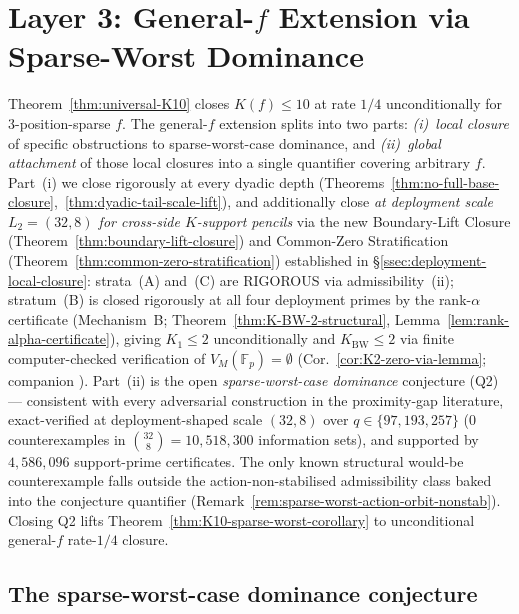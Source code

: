 \documentclass[11pt]{article}
\theoremstyle{definition}
\theoremstyle{remark}
\begin{document}
\section{Layer 3: General-$f$ Extension via Sparse-Worst Dominance}
\label{sec:sparse-worst}

\noindent Theorem~\ref{thm:universal-K10} closes $K(f) \leq 10$ at
rate $1/4$ unconditionally for $3$-position-sparse $f$. The
general-$f$ extension splits into two parts: \emph{(i)~local
closure} of specific obstructions to sparse-worst-case dominance,
and \emph{(ii)~global attachment} of those local closures into a
single quantifier covering arbitrary $f$. Part~(i) we close
rigorously at every dyadic depth
(Theorems~\ref{thm:no-full-base-closure},~\ref{thm:dyadic-tail-scale-lift}),
and additionally close \emph{at deployment scale $L_2 = (32, 8)$ for
cross-side $K$-support pencils} via the new Boundary-Lift Closure
(Theorem~\ref{thm:boundary-lift-closure}) and Common-Zero
Stratification (Theorem~\ref{thm:common-zero-stratification})
established in \S\ref{ssec:deployment-local-closure}: strata~(A) and~(C)
are RIGOROUS via admissibility~(ii); stratum~(B) is closed rigorously
at all four deployment primes by the rank-$\alpha$ certificate
(Mechanism~B; Theorem~\ref{thm:K-BW-2-structural},
Lemma~\ref{lem:rank-alpha-certificate}), giving
$K_1 \leq 2$ unconditionally and $K_{\mathrm{BW}} \leq 2$ via finite
computer-checked verification of $V_M(\mathbb{F}_p) = \emptyset$
(Cor.~\ref{cor:K2-zero-via-lemma}; companion \cite{CompanionRepo}).
Part~(ii) is the open \emph{sparse-worst-case dominance} conjecture
(Q2) --- consistent with every adversarial construction in the
proximity-gap literature, exact-verified at deployment-shaped scale
$(32, 8)$ over $q \in \{97, 193, 257\}$ ($0$ counterexamples in
$\binom{32}{8} = 10{,}518{,}300$ information sets), and supported
by $4{,}586{,}096$ support-prime certificates. The only known
structural would-be counterexample falls outside the
action-non-stabilised admissibility class baked into the conjecture
quantifier (Remark~\ref{rem:sparse-worst-action-orbit-nonstab}).
Closing Q2 lifts Theorem~\ref{thm:K10-sparse-worst-corollary} to
unconditional general-$f$ rate-$1/4$ closure.

\subsection{The sparse-worst-case dominance conjecture}
\label{ssec:sparse-worst-statement}
\end{document}
